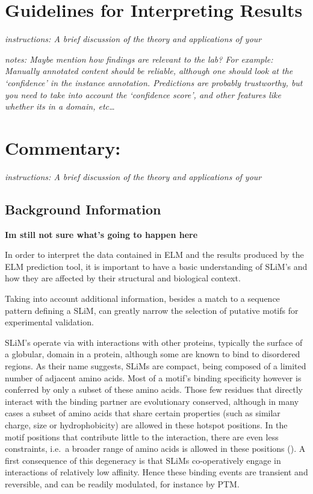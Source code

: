 \section{Guidelines for Interpreting
Results}\label{guidelines-for-interpreting-results}

\emph{instructions: A brief discussion of the theory and applications of
your}

\emph{notes: Maybe mention how findings are relevant to the lab? For
example: Manually annotated content should be reliable, although one
should look at the `confidence' in the instance annotation. Predictions
are probably trustworthy, but you need to take into account the
`confidence score', and other features like whether its in a domain,
etc\ldots{}}

\section{Commentary:}\label{commentary}

\emph{instructions: A brief discussion of the theory and applications of
your}

\subsection{Background Information}\label{background-information}

\textbf{Im still not sure what's going to happen here}

In order to interpret the data contained in ELM and the results produced
by the ELM prediction tool, it is important to have a basic
understanding of SLiM's and how they are affected by their structural
and biological context.

Taking into account additional information, besides a match to a
sequence pattern defining a SLiM, can greatly narrow the selection of
putative motifs for experimental validation.

SLiM's operate via with interactions with other proteins, typically the
surface of a globular, domain in a protein, although some are known to
bind to disordered regions. As their name suggests, SLiMs are compact,
being composed of a limited number of adjacent amino acids. Most of a
motif's binding specificity however is conferred by only a subset of
these amino acids. Those few residues that directly interact with the
binding partner are evolutionary conserved, although in many cases a
subset of amino acids that share certain properties (such as similar
charge, size or hydrophobicity) are allowed in these hotspot positions.
In the motif positions that contribute little to the interaction, there
are even less constraints, i.e.~a broader range of amino acids is
allowed in these positions (\cite{21909575}). A first consequence of
this degeneracy is that SLiMs co-operatively engage in interactions of
relatively low affinity. Hence these binding events are transient and
reversible, and can be readily modulated, for instance by PTM.

